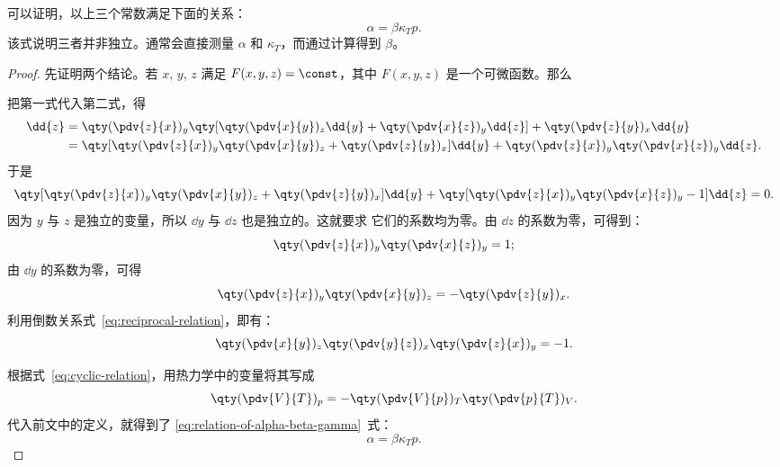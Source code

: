 可以证明，以上三个常数满足下面的关系：
\begin{equation} \label{eq:relation-of-alpha-beta-gamma}
  \alpha = \beta \kappa_T p.
\end{equation}
该式说明三者并非独立。通常会直接测量 $\alpha$ 和 $\kappa_T$，而通过计算得到
$\beta$。

\begin{proof}
  先证明两个结论。若 $x, \, y, \, z$ 满足 $F(x, y, z) = \const$，其中
  $F(x, y, z)$ 是一个可微函数。那么
  把第一式代入第二式，得
  \begin{align}
    \dd{z} &= \qty(\pdv{z}{x})_y
      \qty[\qty(\pdv{x}{y})_z \dd{y} + \qty(\pdv{x}{z})_y \dd{z}]
      + \qty(\pdv{z}{y})_x \dd{y} \notag \\
    &= \qty[\qty(\pdv{z}{x})_y \qty(\pdv{x}{y})_z + \qty(\pdv{z}{y})_x] \dd{y}
      + \qty(\pdv{z}{x})_y \qty(\pdv{x}{z})_y \dd{z}.
  \end{align}
  于是
  \begin{equation} \label{eq:coefficient-of-dy-and-dz}
    \qty[\qty(\pdv{z}{x})_y \qty(\pdv{x}{y})_z + \qty(\pdv{z}{y})_x] \dd{y}
    + \qty[\qty(\pdv{z}{x})_y \qty(\pdv{x}{z})_y - 1] \dd{z} = 0.
  \end{equation}
  因为 $y$ 与 $z$ 是独立的变量，所以 $\dd{y}$ 与 $\dd{z}$ 也是独立的。这就要求
  它们的系数均为零。由 $\dd{z}$ 的系数为零，可得到：
  \begin{equation} \label{eq:reciprocal-relation}
    \qty(\pdv{z}{x})_y \qty(\pdv{x}{z})_y = 1;
  \end{equation}
  由 $\dd{y}$ 的系数为零，可得
  \begin{equation} \label{eq:cyclic-relation}
    \qty(\pdv{z}{x})_y \qty(\pdv{x}{y})_z = -\qty(\pdv{z}{y})_x.
  \end{equation}
  利用倒数关系式~\eqref{eq:reciprocal-relation}，即有：
  \begin{equation}
    \qty(\pdv{x}{y})_z \qty(\pdv{y}{z})_x \qty(\pdv{z}{x})_y = -1.
  \end{equation}

  根据式~\eqref{eq:cyclic-relation}，用热力学中的变量将其写成
  \begin{equation}
    \qty(\pdv{V}{T})_p = -\qty(\pdv{V}{p})_T \qty(\pdv{p}{T})_V.
  \end{equation}
  代入前文中的定义，就得到了 \eqref{eq:relation-of-alpha-beta-gamma}~式：
  \begin{equation}
    \alpha = \beta \kappa_T p.
  \end{equation}
\end{proof}

